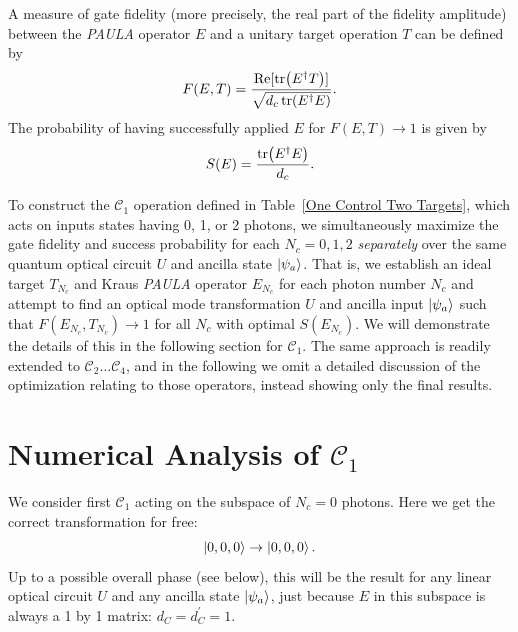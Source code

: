 \documentclass[aps,pra,twocolumn,showpacs,superscriptaddress,floatfix,10pt]{revtex4}
\begin{document}
A measure of gate fidelity (more precisely, the real part of the fidelity amplitude) between the \textit{PAULA} operator $E$ and a unitary target operation $T$ can be defined by
\begin{equation}
\label{Gate Fidelity}
F(E,T) = \frac{\Re[\tr(E^\dagger T)]}{\sqrt{d_c \tr(E^\dagger E)} }.
\end{equation}
The probability of having successfully applied $E$ for $F(E,T) \rightarrow 1$ is given by
\begin{equation}
\label{Success Probability} 
S(E) = \frac{\tr(E^\dagger E)}{d_c}.
\end{equation}

To construct the $\mathcal{C}_1$ operation defined in Table~\ref{One Control Two Targets}, which acts on inputs states having 0, 1, or 2 photons, we simultaneously maximize the gate fidelity and success probability for each  $N_c=0,1,2$ \textit{separately} over the same quantum optical circuit $U$ and ancilla state $\ket{\psi_a}$. That is, we establish an ideal target $T_{N_c}$ and Kraus \textit{PAULA} operator $E_{N_c}$ for each photon number $N_c$ and attempt to find an optical mode transformation $U$ and ancilla input $\ket{\psi_a}$ such that  $F(E_{N_c},T_{N_c}) \rightarrow 1$ for all $N_c$ with optimal $S(E_{N_c})$. We will demonstrate the details of this in the following section for $\mathcal{C}_1$. The same approach is readily extended to $\mathcal{C}_2 \dots \mathcal{C}_4$, and in the following we omit a detailed discussion of the optimization relating to those operators, instead showing only the final results.
\section{Numerical Analysis of $\mathcal{C}_1$}
\label{Section Numerical Testing}
We consider first $\mathcal{C}_1$ acting on the subspace of $N_c=0$ photons. Here we get the correct transformation for free:
\begin{equation}
\label{Free Operation}
\ket{0,0,0} \rightarrow \ket{0,0,0}.
\end{equation}
Up to a possible overall phase (see below), this will be the result for any linear optical circuit  $U$ and any ancilla state $\ket{\psi_a}$, just because $E$ in this subspace is always a 1 by 1 matrix: $d_C = d_C^\prime = 1$.
\end{document}

